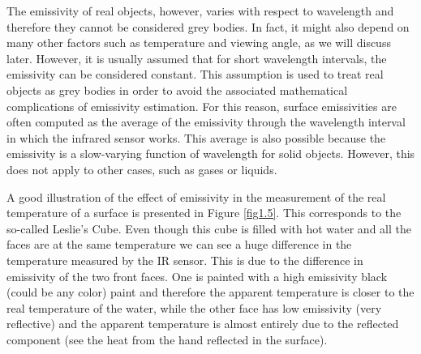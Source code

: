 		\bigskip
		The emissivity of real objects, however, varies with respect to wavelength and therefore they cannot be considered grey bodies. In fact, it might also depend on many other factors such as temperature and viewing angle, as we will discuss later. However, it is usually assumed that for short wavelength intervals, the emissivity can be considered constant. This assumption is used to treat real objects as grey bodies in order to avoid the associated mathematical complications of emissivity estimation. For this reason, surface emissivities are often computed as the average of the emissivity through the wavelength interval in which the infrared sensor works. This average is also possible because the emissivity is a slow-varying function of wavelength for solid objects. However, this does not apply to other cases, such as gases or liquids.
		
		A good illustration of the effect of emissivity in the measurement of the real temperature of a surface is presented in Figure \ref{fig1.5}. This corresponds to the so-called Leslie’s Cube. Even though this cube is filled with hot water and all the faces are at the same temperature we can see a huge difference in the temperature measured by the IR sensor. This is due to the difference in emissivity of the two front faces. One is painted with a high emissivity black (could be any color) paint and therefore the apparent temperature is closer to the real temperature of the water, while the other face has low emissivity (very reflective) and the apparent temperature is almost entirely due to the reflected component (see the heat from the hand reflected in the surface).
		
